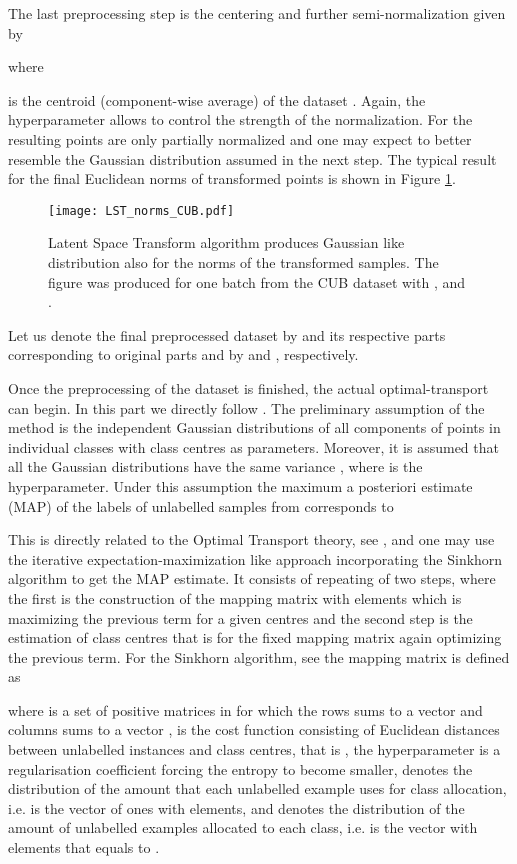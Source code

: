 \documentclass[letterpaper]{article} \usepackage{aaai20}  \usepackage{times}  \usepackage{helvet} \usepackage{courier}  \usepackage[hyphens]{url}  \usepackage{graphicx} \urlstyle{rm} \def\UrlFont{\rm}  \usepackage{graphicx}  \frenchspacing  \setlength{\pdfpagewidth}{8.5in}  \setlength{\pdfpageheight}{11in}  \usepackage[ruled,vlined]{algorithm2e}
\begin{document}
The last preprocessing step is the centering and further semi-normalization given by

where 

is the centroid (component-wise average) of the dataset .
Again, the hyperparameter  allows to control the strength of the normalization. For  the resulting points are only partially
normalized and one may expect to better resemble the Gaussian distribution assumed in the next step. The typical result for the final Euclidean norms of transformed points is shown in Figure \ref{fig:normsLST}.
\begin{figure}[h]
  \texttt{[image: LST\_norms\_CUB.pdf]}
  \caption{Latent Space Transform algorithm produces Gaussian like distribution also for the norms of the transformed samples. 
  The figure was produced for one batch from the CUB dataset with , and .}
  \label{fig:normsLST}
\end{figure}

Let us denote the final preprocessed dataset by  and its respective parts corresponding to original parts  and  by  and , respectively.

Once the preprocessing of the dataset is finished, the actual optimal-transport can begin. In this part we directly follow \cite{hu2020leveraging}.
The preliminary assumption of the method is the independent Gaussian distributions of all components of points in individual classes with class centres  as parameters. Moreover, it is assumed that all the Gaussian distributions have the same variance , where  is the hyperparameter.
Under this assumption the maximum a posteriori estimate (MAP)  of 
the labels of unlabelled samples  from  corresponds to

This is directly related to the Optimal Transport theory, see \cite{hu2020leveraging,marco2013Sinkhorn,berman2020,villani2003},
and one may use the iterative expectation-maximization like approach incorporating the Sinkhorn algorithm to get the MAP estimate.
It consists of repeating of two steps, where the first is the construction of the mapping matrix  with elements  which is maximizing the previous term for a given centres  and the second step is the estimation of class centres 
that is for the fixed 
mapping matrix again optimizing the previous term.
For the Sinkhorn algorithm, see  \cite{marco2013Sinkhorn} the mapping matrix is defined as

where  is a set of positive matrices in  for which the rows sums to a vector  and columns sums to a vector , 
 is the cost function consisting of Euclidean distances between unlabelled instances and class centres, that is 
, the hyperparameter  is a regularisation coefficient forcing the entropy 
 to become smaller, 
 denotes the distribution of the amount that each unlabelled example uses for class allocation, i.e.  is the vector of ones with  elements, 
and  denotes the distribution of the amount of unlabelled examples allocated to each class, i.e.  is the vector with  elements that equals to .
\end{document}
